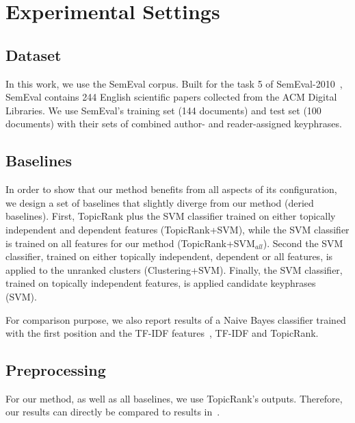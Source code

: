 \section{Experimental Settings}
\label{sec:experimental_settings}
  \subsection{Dataset}
  \label{subsec:dataset}
    In this work, we use the SemEval corpus. Built for the task 5 of
    SemEval-2010~\cite{kim2010semeval}, Sem\-Eval contains 244 English
    scientific papers collected from the ACM Digital Libraries. We use
    Sem\-Eval's training set (144 documents) and test set (100 documents) with
    their sets of combined author- and reader-assigned keyphrases.

  \subsection{Baselines}
  \label{subsec:baselines}
    In order to show that our method benefits from all aspects of its
    configuration, we design a set of baselines that slightly diverge from our
    method (deried baselines). First, To\-picRank plus the SVM classifier
    trained on either topically independent and dependent features
    (TopicRank+SVM), while the SVM classifier is trained on all features for our
    method (TopicRank+SVM$_{all}$). Second the SVM classifier, trained on either
    topically independent, dependent or all features, is applied to the unranked
    clusters (Clustering+SVM). Finally, the SVM classifier, trained on topically
    independent features, is applied candidate keyphrases (SVM).

    For comparison purpose, we also report results of a Naive Bayes classifier
    trained with the first position and the TF-IDF
    features~\cite[KEA]{witten1999kea}, TF-IDF and TopicRank.

  \subsection{Preprocessing}
  \label{subsec:preprocessing}
    For our method, as well as all baselines, we use Topic\-Rank's outputs.
    Therefore, our results can directly be compared to results
    in~\cite{bougouin2013topicrank}.

